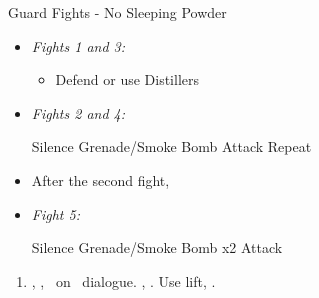 \begin{battle}{Guard Fights - No Sleeping Powder}
  \begin{itemize}
    \item \textit{Fights 1 and 3:}
          \begin{itemize}
            \tidusf Attack
            \item Defend or use Distillers
          \end{itemize}
    \item \textit{Fights 2 and 4:}
          \begin{itemize}
            \switch{\tidus}{\kimahri}
            \kimahrif Silence Grenade/Smoke Bomb
            \switch{\rikku}{\tidus}
            \tidusf Attack
            \kimahrif Repeat
          \end{itemize}
    \item After the second fight, \formation{\tidus}{\rikku}{\lulu}
    \item \textit{Fight 5:}
          \begin{itemize}
            \switch{\tidus}{\rikku}
            \rikkuf Silence Grenade/Smoke Bomb x2
            \switch{\kimahri}{\tidus}
            \tidusf Attack
          \end{itemize}
  \end{itemize}
\end{battle}
\begin{enumerate}[resume]
  \item \sd, \fmv[1:30], \sd\ on \yuna\ dialogue. \skippablefmv[30], \sd. Use lift, \sd.
\end{enumerate}
\vfill
